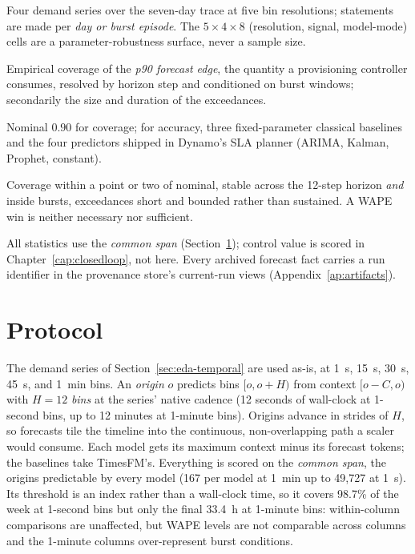 \begin{description}
\setlength{\itemsep}{0pt}\setlength{\parskip}{0pt}
\item[Population and unit.] Four demand series over the seven-day trace at
five bin resolutions; statements are made per \emph{day or burst episode}.
The $5\times4\times8$ (resolution, signal, model-mode) cells are a
parameter-robustness surface, never a sample size.
\item[Primary endpoint.] Empirical coverage of the \emph{p90 forecast
edge}, the quantity a provisioning controller consumes, resolved by horizon
step and conditioned on burst windows; secondarily the size and duration
of the exceedances.
\item[Comparator.] Nominal $0.90$ for coverage; for accuracy, three
fixed-parameter classical baselines and the four predictors shipped in
Dynamo's SLA planner (ARIMA, Kalman, Prophet, constant).
\item[Success criterion.] Coverage within a point or two of nominal, stable
across the 12-step horizon \emph{and} inside bursts, exceedances short and
bounded rather than sustained. A WAPE win is neither necessary nor
sufficient.
\item[Scope.] All statistics use the \emph{common span}
(Section~\ref{sec:pred-protocol}); control value is scored in
Chapter~\ref{cap:closedloop}, not here. Every archived forecast fact
carries a run identifier in the provenance store's current-run views
(Appendix~\ref{ap:artifacts}).
\end{description}

\section{Protocol}
\label{sec:pred-protocol}

The demand series of Section~\ref{sec:eda-temporal} are used as-is, at
\SI{1}{\second}, \SI{15}{\second}, \SI{30}{\second}, \SI{45}{\second}, and
\SI{1}{\minute} bins. An \emph{origin} $o$ predicts bins $[o, o{+}H)$ from
context $[o{-}C, o)$ with $H{=}12$ \emph{bins} at the series' native
cadence (12 seconds of wall-clock at 1-second bins, up to 12 minutes at
1-minute bins). Origins advance in strides of $H$, so forecasts tile
the timeline into the continuous, non-overlapping path a scaler would
consume. Each model gets its maximum context minus its forecast tokens; the
baselines take TimesFM's. Everything is scored on the \emph{common span},
the origins predictable by every model (167 per model at \SI{1}{\minute} up
to 49{,}727 at \SI{1}{\second}). Its threshold is an index rather than a
wall-clock time, so it covers 98.7\% of the week at 1-second bins but only
the final \SI{33.4}{\hour} at 1-minute bins: within-column comparisons are
unaffected, but WAPE levels are not comparable across columns and the
1-minute columns over-represent burst conditions.

